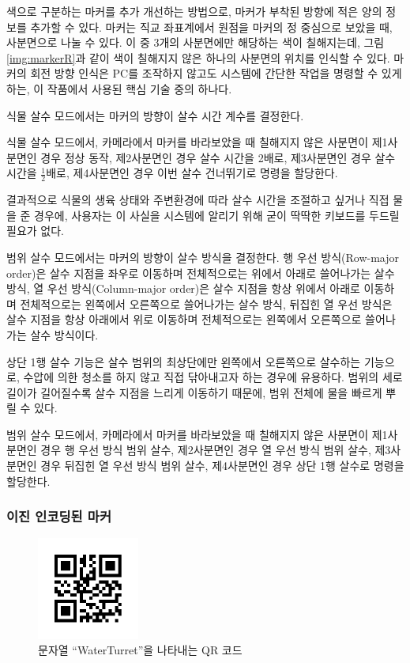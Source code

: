 \documentclass[chapter,11pt,oneside,openany]{xoblivoir}
\begin{document}
색으로 구분하는 마커를 추가 개선하는 방법으로, 마커가 부착된 방향에 적은 양의 정보를 추가할 수 있다.
마커는 직교 좌표계에서 원점을 마커의 정 중심으로 보았을 때, 사분면으로 나눌 수 있다.
이 중 3개의 사분면에만 해당하는 색이 칠해지는데, 그림 \ref{img:markerR}과 같이 색이 칠해지지 않은 하나의 사분면의 위치를 인식할 수 있다. 마커의 회전 방향 인식은 PC를 조작하지 않고도 시스템에 간단한 작업을 명령할 수 있게 하는, 이 작품에서 사용된 핵심 기술 중의 하나다.

식물 살수 모드에서는 마커의 방향이 살수 시간 계수를 결정한다.

식물 살수 모드에서, 카메라에서 마커를 바라보았을 때 칠해지지 않은 사분면이
제1사분면인 경우 정상 동작, 제2사분면인 경우 살수 시간을 2배로,
제3사분면인 경우 살수 시간을 $\frac{1}{2}$배로, 제4사분면인 경우 이번 살수 건너뛰기로 명령을 할당한다.

결과적으로 식물의 생육 상태와 주변환경에 따라 살수 시간을 조절하고 싶거나 직접 물을 준 경우에,
사용자는 이 사실을 시스템에 알리기 위해 굳이 딱딱한 키보드를 두드릴 필요가 없다.

범위 살수 모드에서는 마커의 방향이 살수 방식을 결정한다.
행 우선 방식(Row-major order)은 살수 지점을 좌우로 이동하며
전체적으로는 위에서 아래로 쓸어나가는 살수 방식,
열 우선 방식(Column-major order)은 살수 지점을 항상 위에서 아래로 이동하며
전체적으로는 왼쪽에서 오른쪽으로 쓸어나가는 살수 방식,
뒤집힌 열 우선 방식은 살수 지점을 항상 아래에서 위로 이동하며
전체적으로는 왼쪽에서 오른쪽으로 쓸어나가는 살수 방식이다.

상단 1행 살수 기능은 살수 범위의 최상단에만 왼쪽에서 오른쪽으로 살수하는 기능으로,
수압에 의한 청소를 하지 않고 직접 닦아내고자 하는 경우에 유용하다.
범위의 세로 길이가 길어질수록 살수 지점을 느리게 이동하기 때문에,
범위 전체에 물을 빠르게 뿌릴 수 있다.

범위 살수 모드에서, 카메라에서 마커를 바라보았을 때 칠해지지 않은 사분면이
제1사분면인 경우 행 우선 방식 범위 살수,
제2사분면인 경우 열 우선 방식 범위 살수,
제3사분면인 경우 뒤집힌 열 우선 방식 범위 살수,
제4사분면인 경우 상단 1행 살수로 명령을 할당한다.


\subsubsection{이진 인코딩된 마커}

\begin{figure}[ht]
\centering
\includegraphics[width=0.3\textwidth]{img/qrcode}
\caption[QR 코드]{문자열 ``WaterTurret''을 나타내는 QR 코드}
\label{img:qrcode}
\end{figure}
\end{document}
